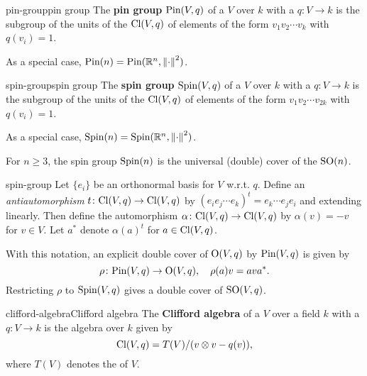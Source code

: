 \begin{topic}{pin-group}{pin group}
    The \textbf{pin group} $\textup{Pin}(V, q)$ of a  $V$ over $k$ with a  $q \colon V \to k$ is the subgroup of the units of the  $\textup{Cl}(V, q)$ of elements of the form $v_1 v_2 \cdots v_k$ with $q(v_i) = 1$.
    
    As a special case, $\textup{Pin}(n) = \textup{Pin}(\mathbb{R}^n, \left\|\cdot\right\|^2)$.
\end{topic}

\begin{topic}{spin-group}{spin group}
    The \textbf{spin group} $\textup{Spin}(V, q)$ of a  $V$ over $k$ with a  $q \colon V \to k$ is the subgroup of the units of the  $\textup{Cl}(V, q)$ of elements of the form $v_1 v_2 \cdots v_{2k}$ with $q(v_i) = 1$.

    As a special case, $\textup{Spin}(n) = \textup{Spin}(\mathbb{R}^n, \left\|\cdot\right\|^2)$.
    
    For $n \ge 3$, the spin group $\textup{Spin}(n)$ is the universal (double) cover of the  $\textup{SO}(n)$.
\end{topic}

\begin{example}{spin-group}
    Let $\{ e_i \}$ be an orthonormal basis for $V$ w.r.t. $q$. Define an \textit{antiautomorphism} $t \colon \textup{Cl}(V, q) \to \textup{Cl}(V, q)$ by $(e_i e_j \cdots e_k)^t = e_k \cdots e_j e_i$ and extending linearly. Then define the automorphism $\alpha \colon \textup{Cl}(V, q) \to \textup{Cl}(V, q)$ by $\alpha(v) = -v$ for $v \in V$. Let $a^*$ denote $\alpha(a)^t$ for $a \in \textup{Cl}(V, q)$.
    
    With this notation, an explicit double cover of $\textup{O}(V, q)$ by $\textup{Pin}(V, q)$ is given by
    \[ \rho \colon \textup{Pin}(V, q) \to \textup{O}(V, q), \quad \rho(a) v = a v a^* . \]
    Restricting $\rho$ to $\textup{Spin}(V, q)$ gives a double cover of $\textup{SO}(V, q)$.
\end{example}

\begin{topic}{clifford-algebra}{Clifford algebra}
    The \textbf{Clifford algebra} of a  $V$ over a field $k$ with a  $q \colon V \to k$ is the algebra over $k$ given by
    \[ \textup{Cl}(V, q) = T(V) / (v \otimes v - q(v)) , \]
    where $T(V)$ denotes the  of $V$.
\end{topic}

